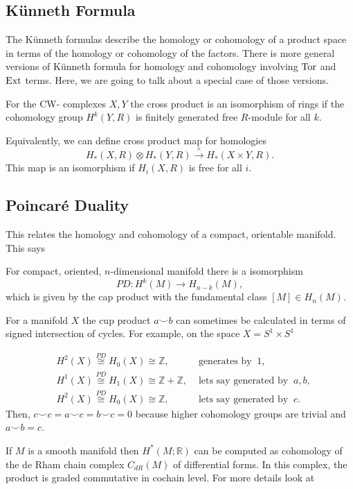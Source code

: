  	\subsection{K\"unneth Formula}
 	The K\"unneth formulas describe the homology or cohomology of a product space in terms of the homology or cohomology of the factors.
 	There is more general versions of K\"unneth formula for homology and cohomology involving \(\operatorname{Tor}\) and \(\operatorname{Ext}\) terms.
 	Here, we are going to talk about a special case of those versions.
 	
 	\begin{theorem}
 	For the CW- complexes \(X, Y\) the cross product is an isomorphism of rings if the cohomology group \(H^k(Y, R)\) is finitely generated free \(R\)-module for all \(k\). 	
 	\end{theorem}
 	Equivalently, we can define cross product map for homologies
 	\[H_\ast(X,R) \otimes H_\ast(Y,R) \xrightarrow{\times} H_\ast(X\times Y , R).\]
 	This map is an isomorphism if \(H_i(X,R)\) is free for all \(i\).
 	
 	\subsection{Poincar\'e Duality}
 	This relates the homology and cohomology of a compact, orientable manifold.
 	This says
 	\begin{theorem}
 		For compact, oriented, \(n\)-dimensional manifold there is a isomorphism 
 		\[PD: H^k(M) \to H_{n-k}(M),\]
 		which is given by the cap product with the fundamental class \([M] \in H_n(M)\).
 	\end{theorem}
 	
 	For a manifold \(X\) the cup product \(a \smile b\) can sometimes be calculated in terms of signed intersection of cycles.
 	For example, on the space \(X = S^1 \times S^1\)
 	
 	\begin{align*}
 		&H^2(X) \stackrel{PD}{\cong} H_0(X) \cong \mathbb Z, &\text{ generates by }\ 1,\\
 		&H^1(X) \stackrel{PD}{\cong} H_1(X) \cong \mathbb Z + \mathbb Z, &\text{ lets say generated by }\ a, b,\\
 		&H^2(X) \stackrel{PD}{\cong} H_0(X) \cong \mathbb Z, &\text{ lets say generated by }\ c.
 	\end{align*}
 	Then, \(c\smile c = a \smile c = b \smile c = 0\) because higher cohomology groups are trivial and 
 	\(a \smile b = c\).
 	\vspace{0.5 cm}

 	If \(M\) is a smooth manifold then \(H^\ast(M;\mathbb R)\) can be computed as cohomology of the de Rham chain complex \(C_{dR}(M)\) of differential forms.
 	In this complex, the product is graded commutative in cochain level.
 	For more details look at \cite{Bott_Tu1982}
